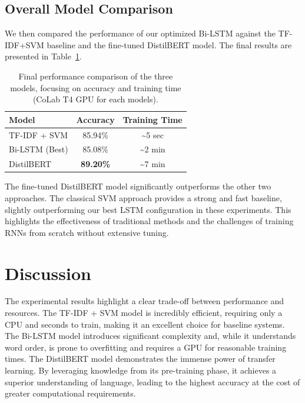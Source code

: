 \documentclass[11pt]{article}
\begin{document}
\subsection{Overall Model Comparison}
We then compared the performance of our optimized Bi-LSTM against the TF-IDF+SVM baseline and the fine-tuned DistilBERT model. The final results are presented in Table~\ref{tab:final-comparison}.

\begin{table}[h!]
\centering
\begin{tabular}{lcc}
\toprule
\textbf{Model} & \textbf{Accuracy} & \textbf{Training Time} \\
\midrule
TF-IDF + SVM & 85.94\% & \textasciitilde5 sec \\
Bi-LSTM (Best) & 85.08\% & \textasciitilde2 min \\
DistilBERT & \textbf{89.20\%} & \textasciitilde7 min \\
\bottomrule
\end{tabular}
\caption{Final performance comparison of the three models, focusing on accuracy and training time (CoLab T4 GPU for each models).}
\label{tab:final-comparison}
\end{table}

The fine-tuned DistilBERT model significantly outperforms the other two approaches. The classical SVM approach provides a strong and fast baseline, slightly outperforming our best LSTM configuration in these experiments. This highlights the effectiveness of traditional methods and the challenges of training RNNs from scratch without extensive tuning.

\section{Discussion}
The experimental results highlight a clear trade-off between performance and resources. The TF-IDF + SVM model is incredibly efficient, requiring only a CPU and seconds to train, making it an excellent choice for baseline systems. The Bi-LSTM model introduces significant complexity and, while it understands word order, is prone to overfitting and requires a GPU for reasonable training times. The DistilBERT model demonstrates the immense power of transfer learning. By leveraging knowledge from its pre-training phase, it achieves a superior understanding of language, leading to the highest accuracy at the cost of greater computational requirements.
\end{document}

